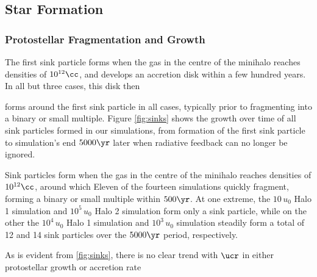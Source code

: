 \subsection{Star Formation}
\subsubsection{Protostellar Fragmentation and Growth}
\label{subsec:sink_formation}

The first sink particle forms when the gas in the centre of the minihalo reaches densities of $10^{12}\cc$, and develops an accretion disk within a few hundred years. In all but three cases, this disk then 

forms around the first sink particle in all cases, typically prior to fragmenting into a binary or small multiple.
Figure \ref{fig:sinks} shows the growth over time of all sink particles formed in our simulations, from formation of the first sink particle to simulation's end $5000\yr$ later when radiative feedback can no longer be ignored. 

Sink particles form when the gas in the centre of the minihalo reaches densities of $10^{12}\cc$, around which  Eleven of the fourteen simulations quickly fragment, forming a binary or small multiple within $500\yr$.  At one extreme, the $10\,u_0$ Halo 1 simulation and $10^5\,u_0$ Halo 2 simulation form only a sink particle, while on the other the $10^4\,u_0$ Halo 1 simulation and $10^3\,u_0$ simulation steadily form a total of 12 and 14 sink particles over the $5000\yr$ period, respectively.

As is evident from \ref{fig:sinks}, there is no clear trend with $\ucr$ in either protostellar growth or accretion rate



